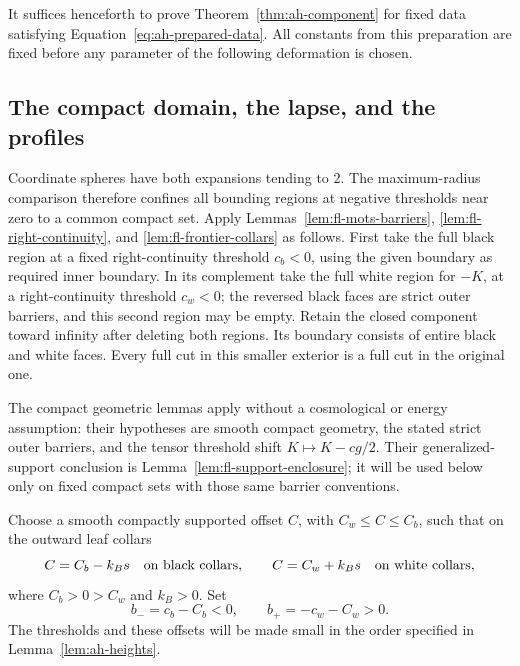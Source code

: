 It suffices henceforth to prove Theorem~\ref{thm:ah-component} for
fixed data satisfying Equation~\eqref{eq:ah-prepared-data}.
All constants from this preparation are fixed before any parameter
of the following deformation is chosen.

\subsection{The compact domain, the lapse, and the profiles}
\label{subsec:ah-profiles}

Coordinate spheres have both expansions tending to \(2\).  The
maximum-radius comparison therefore confines all bounding regions
at negative thresholds near zero to a common compact set.  Apply
Lemmas~\ref{lem:fl-mots-barriers},
\ref{lem:fl-right-continuity}, and
\ref{lem:fl-frontier-collars} as follows.  First take the full black
region at a fixed right-continuity threshold \(c_b<0\), using the
given boundary as required inner boundary.  In its complement take
the full white region for \(-K\), at a right-continuity threshold
\(c_w<0\); the reversed black faces are strict outer barriers, and
this second region may be empty.  Retain the closed component
toward infinity after deleting both regions.  Its boundary consists
of entire black and white faces.  Every full cut in this smaller
exterior is a full cut in the original one.

The compact geometric lemmas apply without a cosmological or energy
assumption: their hypotheses are smooth compact geometry, the stated
strict outer barriers, and the tensor threshold shift
\(K\mapsto K-cg/2\).  Their generalized-support conclusion is
Lemma~\ref{lem:fl-support-enclosure}; it will be used below only on
fixed compact sets with those same barrier conventions.

Choose a smooth compactly supported offset \(C\), with
\(C_w\le C\le C_b\), such that on the outward leaf collars
\[
 C=C_b-k_Bs\quad\hbox{on black collars},\qquad
 C=C_w+k_Bs\quad\hbox{on white collars},
\]
where \(C_b>0>C_w\) and \(k_B>0\).  Set
\begin{equation}\label{eq:ah-face-heights}
 b_-=c_b-C_b<0,\qquad b_+=-c_w-C_w>0 .
\end{equation}
The thresholds and these offsets will be made small in the order
specified in Lemma~\ref{lem:ah-heights}.


